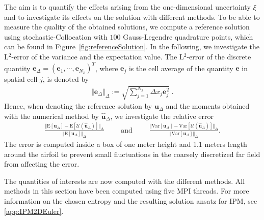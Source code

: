 The aim is to quantify the effects arising from the one-dimensional uncertainty $\xi$ and to investigate its effects on the solution with different methods. To be able to measure the quality of the obtained solutions, we compute a reference solution using stochastic-Collocation with $100$ Gauss-Legendre quadrature points, which can be found in Figure~\ref{fig:referenceSolution}. In the following, we investigate the L$^2$-error of the variance and the expectation value. The L$^2$-error of the discrete quantity $\bm e_{\Delta}=(\bm e_1,\cdots,\bm e_{N_x})^T$, where $\bm e_j$ is the cell average of the quantity $\bm e$ in spatial cell $j$, is denoted by
\begin{align*}
\Vert \bm e_{\Delta} \Vert_{\Delta} := \sqrt{\sum_{j=1}^{N_x} \Delta x_j \bm e_j^2}\;.
\end{align*}
Hence, when denoting the reference solution by $\bm u_{\Delta}$ and the moments obtained with the numerical method by $\bm{\hat u}_{\Delta}$, we investigate the relative error
\begin{align*}
\frac{\Vert \text{E}[\bm u_{\Delta}] - \text{E}[\mathcal{U}(\bm{\hat u}_{\Delta})] \Vert_{\Delta}}{\Vert \text{E}[\bm u_{\Delta}] \Vert_{\Delta}} \qquad \text{ and }\qquad \frac{\Vert \text{Var}[\bm u_{\Delta}] - \text{Var}[\mathcal{U}(\bm{\hat u}_{\Delta})] \Vert_{\Delta}}{\Vert \text{Var}[\bm u_{\Delta}] \Vert_{\Delta}}.
\end{align*}
The error is computed inside a box of one meter height and 1.1 meters length around the airfoil to prevent small fluctuations in the coarsely discretized far field from affecting the error.

The quantities of interests are now computed with the different methods. All methods in this section have been computed using five MPI threads. For more information on the chosen entropy and the resulting solution ansatz for IPM, see \ref{app:IPM2DEuler}. 

